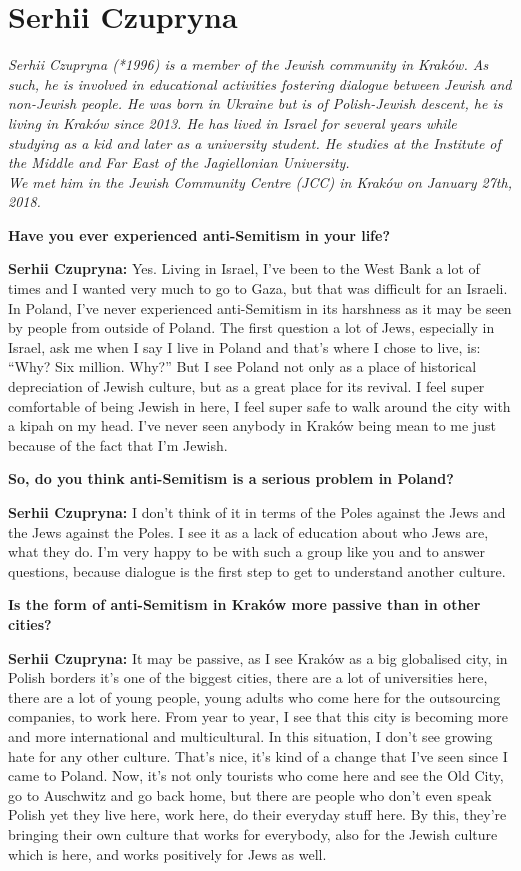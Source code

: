 \section{Serhii Czupryna}

\textit{Serhii Czupryna (*1996) is a member of the Jewish community in Kraków. As such, he is involved in educational activities fostering dialogue between Jewish and non-Jewish people. He was born in Ukraine but is of Polish-Jewish descent, he is living in Kraków since 2013. He has lived in Israel for several years while studying as a kid and later as a university student. He studies at the Institute of the Middle and Far East of the Jagiellonian University. \\
We met him in the Jewish Community Centre (JCC) in Kraków on January 27th, 2018.}\par
\vspace*{2em}
\textbf{Have you ever experienced anti-Semitism in your life?}\par
\textbf{Serhii Czupryna:} Yes. Living in Israel, I’ve been to the West Bank a lot of times and I wanted very much to go to Gaza, but that was difficult for an Israeli. In Poland, I’ve never experienced anti-Semitism in its harshness as it may be seen by people from outside of Poland. The first question a lot of Jews, especially in Israel, ask me when I say I live in Poland and that’s where I chose to live, is: ``Why? Six million. Why?'' But I see Poland not only as a place of historical depreciation of Jewish culture, but as a great place for its revival. I feel super comfortable of being Jewish in here, I feel super safe to walk around the city with a kipah on my head. I’ve never seen anybody in Kraków being mean to me just because of the fact that I’m Jewish. \par
\textbf{So, do you think anti-Semitism is a serious problem in Poland?}\par 
\textbf{Serhii Czupryna:} I don’t think of it in terms of the Poles against the Jews and the Jews against the Poles. I see it as a lack of education about who Jews are, what they do. I’m very happy to be with such a group like you and to answer questions, because dialogue is the first step to get to understand another culture. \par
\textbf{Is the form of anti-Semitism in Kraków more passive than in other cities?}\par
\textbf{Serhii Czupryna:} It may be passive, as I see Kraków as a big globalised city, in Polish borders it’s one of the biggest cities, there are a lot of universities here, there are a lot of young people, young adults who come here for the outsourcing companies, to work here. From year to year, I see that this city is becoming more and more international and multicultural. In this situation, I don’t see growing hate for any other culture. That’s nice, it's kind of a change that I’ve seen since I came to Poland. Now, it’s not only tourists who come here and see the Old City, go to Auschwitz and go back home, but there are people who don’t even speak Polish yet they live here, work here, do their everyday stuff here. By this, they’re bringing their own culture that works for everybody, also for the Jewish culture which is here, and works positively for Jews as well.\par 
